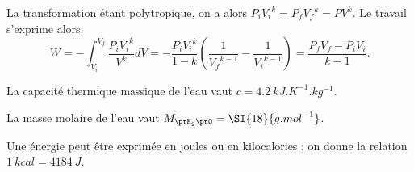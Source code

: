
\begin{corrige}
	La transformation étant polytropique, on a alors $P_i {V_i}^k=P_f {V_f}^k=P V^k$.
	Le travail s'exprime alors:
	\[
	W= -\int_{V_i}^{V_f} \frac{P_i {V_i}^k}{V^k}dV =- \frac{P_i {V_i}^k} {1-k}  \left(\frac{1} {{V_f}^{k-1}}-\frac{1} {{V_i}^{k-1}}\right) = \frac{P_f V_f - P_i V_i}{k-1}.
	\]
\end{corrige}





\finEntrainement










\hauteurLargeurCadreReponse		{8mm}{3cm}
\initialisationEntrainement

La capacité thermique massique de l'eau %
vaut $c=\SI{4,2 }{kJ.K^{-1}.kg^{-1}}$.

La masse molaire de l'eau vaut ${M}_{\ptH_2\ptO}=\SI{18}{g.{mol}^{-1}}$.

Une énergie peut être exprimée en joules ou en kilocalories ; on donne la relation $\SI{1}{kcal}=\SI{4184}{J}$.

